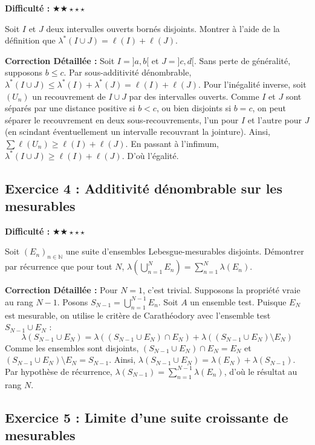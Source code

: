 \documentclass[11pt,a4paper]{article}
\begin{document}
\textbf{Difficulté :} $\bigstar\bigstar\star\star\star$

Soit $I$ et $J$ deux intervalles ouverts bornés disjoints. Montrer à l'aide de la définition que $\lambda^*(I \cup J) = \ell(I) + \ell(J)$.

\textbf{Correction Détaillée :}
Soit $I = ]a, b[$ et $J = ]c, d[$. Sans perte de généralité, supposons $b \le c$.
Par sous-additivité dénombrable, $\lambda^*(I \cup J) \le \lambda^*(I) + \lambda^*(J) = \ell(I) + \ell(J)$.
Pour l'inégalité inverse, soit $(U_n)$ un recouvrement de $I \cup J$ par des intervalles ouverts.
Comme $I$ et $J$ sont séparés par une distance positive si $b < c$, ou bien disjoints si $b=c$, on peut séparer le recouvrement en deux sous-recouvrements, l'un pour $I$ et l'autre pour $J$ (en scindant éventuellement un intervalle recouvrant la jointure).
Ainsi, $\sum \ell(U_n) \ge \ell(I) + \ell(J)$. En passant à l'infimum, $\lambda^*(I \cup J) \ge \ell(I) + \ell(J)$.
D'où l'égalité.

\newpage
\subsection*{Exercice 4 : Additivité dénombrable sur les mesurables}

\textbf{Difficulté :} $\bigstar\bigstar\star\star\star$

Soit $(E_n)_{n \in \mathbb{N}}$ une suite d'ensembles Lebesgue-mesurables disjoints. Démontrer par récurrence que pour tout $N$, $\lambda\left(\bigcup_{n=1}^N E_n\right) = \sum_{n=1}^N \lambda(E_n)$.

\textbf{Correction Détaillée :}
Pour $N=1$, c'est trivial.
Supposons la propriété vraie au rang $N-1$.
Posons $S_{N-1} = \bigcup_{n=1}^{N-1} E_n$. Soit $A$ un ensemble test. Puisque $E_N$ est mesurable, on utilise le critère de Carathéodory avec l'ensemble test $S_{N-1} \cup E_N$ :
$$\lambda(S_{N-1} \cup E_N) = \lambda((S_{N-1} \cup E_N) \cap E_N) + \lambda((S_{N-1} \cup E_N) \setminus E_N)$$
Comme les ensembles sont disjoints, $(S_{N-1} \cup E_N) \cap E_N = E_N$ et $(S_{N-1} \cup E_N) \setminus E_N = S_{N-1}$.
Ainsi, $\lambda(S_{N-1} \cup E_N) = \lambda(E_N) + \lambda(S_{N-1})$.
Par hypothèse de récurrence, $\lambda(S_{N-1}) = \sum_{n=1}^{N-1} \lambda(E_n)$, d'où le résultat au rang $N$.

\newpage
\subsection*{Exercice 5 : Limite d'une suite croissante de mesurables}
\end{document}
